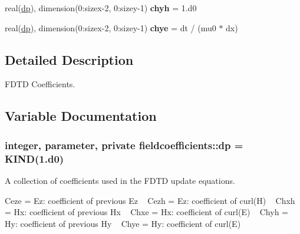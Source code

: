 \begin{DoxyCompactItemize}
\item 
\hypertarget{namespacefieldcoefficients_a3704cd3a2f9bd8205c6e3550d96038c0}{}real(\hyperlink{namespacefieldcoefficients_a78dd03a7796957c315376825498c96e6}{dp}), dimension(0\+:sizex-\/2, 0\+:sizey-\/1) {\bfseries chyh} = 1.d0\label{namespacefieldcoefficients_a3704cd3a2f9bd8205c6e3550d96038c0}

\item 
\hypertarget{namespacefieldcoefficients_aa5b53e7a9497d541b0afc297a0ae83b2}{}real(\hyperlink{namespacefieldcoefficients_a78dd03a7796957c315376825498c96e6}{dp}), dimension(0\+:sizex-\/2, 0\+:sizey-\/1) {\bfseries chye} = dt / (mu0 $\ast$ dx)\label{namespacefieldcoefficients_aa5b53e7a9497d541b0afc297a0ae83b2}

\end{DoxyCompactItemize}


\subsection{Detailed Description}
F\+D\+T\+D Coefficients. 

\subsection{Variable Documentation}
\hypertarget{namespacefieldcoefficients_a78dd03a7796957c315376825498c96e6}{}
\subsubsection[{dp}]{\setlength{\rightskip}{0pt plus 5cm}integer, parameter, private fieldcoefficients\+::dp = K\+I\+N\+D(1.d0)}\label{namespacefieldcoefficients_a78dd03a7796957c315376825498c96e6}


A collection of coefficients used in the F\+D\+T\+D update equations. 

Ceze = Ez\+: coefficient of previous Ez ~\newline
 Cezh = Ez\+: coefficient of curl(\+H) ~\newline
 Chxh = Hx\+: coefficient of previous Hx ~\newline
 Chxe = Hx\+: coefficient of curl(\+E) ~\newline
 Chyh = Hy\+: coefficient of previous Hy ~\newline
 Chye = Hy\+: coefficient of curl(\+E) ~\newline
 